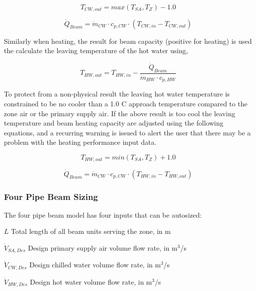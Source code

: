 \begin{equation}
  {T_{CW,out}} = { max( {T_{SA}} , {T_{Z}}) - 1.0 }
\end{equation}

\begin{equation}
  {\dot Q_{Beam}} = {\dot m_{CW}} \cdot {c_{p,CW}} \cdot {( {T_{CW,in}} - {T_{CW,out}})}
\end{equation}

Similarly when heating, the result for beam capacity (positive for heating) is used the calculate the leaving temperature of the hot water using,

\begin{equation}
{T_{HW,out}} = {T_{HW,in}} - \frac{{\dot Q_{Beam}}}{{\dot m_{HW}} \cdot {c_{p,HW}} }
\end{equation}

To protect from a non-physical result the leaving hot water temperature is constrained to be no cooler than a 1.0 C approach temperature compared to the zone air or the primary supply air. If the above result is too cool the leaving temperature and beam heating capacity are adjusted using the following equations, and a recurring warning is issued to alert the user that there may be a problem with the heating performance input data.

\begin{equation}
  {T_{HW,out}} = { min( {T_{SA}} , {T_{Z}}) + 1.0 }
\end{equation}

\begin{equation}
  {\dot Q_{Beam}} = {\dot m_{CW}} \cdot {c_{p,CW}} \cdot {( {T_{HW,in}} - {T_{HW,out}}) }
\end{equation}

\subsubsection{Four Pipe Beam Sizing}\label{four-pipe-beam-sizing}

The four pipe beam model has four inputs that can be autosized:

\({L}\) Total length of all beam units serving the zone, in m

\({\dot V_{SA,Des}}\) Design primary supply air volume flow rate, in m\(^{3}\)/s

\({\dot V_{CW,Des}}\) Design chilled water volume flow rate, in m\(^{3}\)/s

\({\dot V_{HW,Des}}\) Design hot water volume flow rate, in m\(^{3}\)/s

